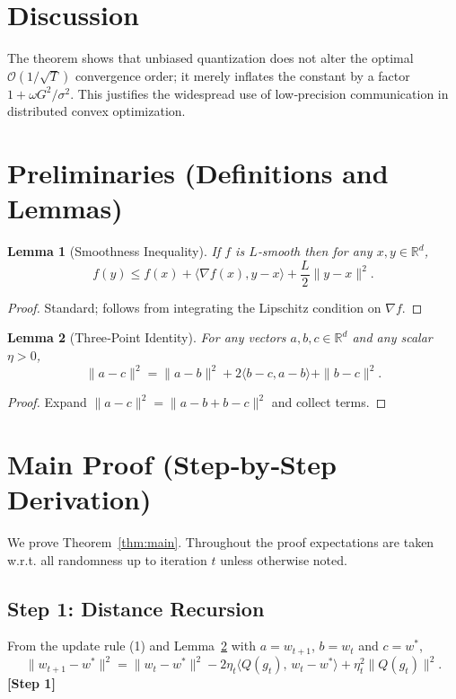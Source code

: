 \documentclass{article}
\newtheorem{lemma}{Lemma}
\newcommand{\R}{\mathbb{R}}
\begin{document}
\section*{Discussion}
The theorem shows that unbiased quantization does not alter the optimal $\mathcal{O}(1/\sqrt{T})$ convergence order; it merely inflates the constant by a factor $1+\omega G^{2}/\sigma^{2}$. This justifies the widespread use of low‑precision communication in distributed convex optimization.

\section*{Preliminaries (Definitions and Lemmas)}
\begin{lemma}[Smoothness Inequality]\label{lem:smooth}
If $f$ is $L$‑smooth then for any $x,y\in\R^{d}$,
\[
f(y)\le f(x)+\langle\nabla f(x),y-x\rangle+\frac{L}{2}\|y-x\|^{2}.
\]
\end{lemma}
\begin{proof}
Standard; follows from integrating the Lipschitz condition on $\nabla f$. \qedhere
\end{proof}

\begin{lemma}[Three‑Point Identity]\label{lem:three}
For any vectors $a,b,c\in\R^{d}$ and any scalar $\eta>0$,
\[
\|a-c\|^{2}= \|a-b\|^{2}+2\langle b-c,a-b\rangle+\|b-c\|^{2}.
\]
\end{lemma}
\begin{proof}
Expand $\|a-c\|^{2}=\|a-b+b-c\|^{2}$ and collect terms. \qedhere
\end{proof}

\section*{Main Proof (Step‑by‑Step Derivation)}
We prove Theorem~\ref{thm:main}.  Throughout the proof expectations are taken w.r.t. all randomness up to iteration $t$ unless otherwise noted.

\subsection*{Step 1: Distance Recursion}
From the update rule (1) and Lemma~\ref{lem:three} with $a=w_{t+1}$, $b=w_{t}$ and $c=w^{*}$,
\[
\|w_{t+1}-w^{*}\|^{2}
= \|w_{t}-w^{*}\|^{2}
-2\eta_{t}\langle Q(g_{t}),\,w_{t}-w^{*}\rangle
+\eta_{t}^{2}\|Q(g_{t})\|^{2}. \tag{3}
\]
\textbf{[Step 1]}
\end{document}
